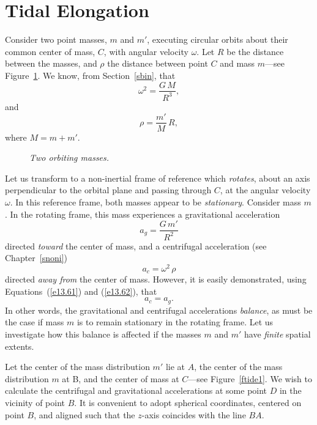 \section{Tidal Elongation}
Consider two point masses, $m$ and $m'$, executing circular orbits
about their common center of mass, $C$, with angular
velocity $\omega$. Let $R$ be the distance between
the masses, and $\rho$ the distance between point $C$ and mass $m$---see Figure~\ref{ftide}.
We know, from Section~\ref{sbin}, that
\begin{equation}\label{e13.61}
\omega^2 = \frac{G\,M}{R^3},
\end{equation}
and
\begin{equation}\label{e13.62}
\rho = \frac{m'}{M}\,R,
\end{equation}
where $M=m+m'$.

\begin{figure}
\centerline{}
\caption{\em Two orbiting masses.}\label{ftide}
\end{figure}

Let us transform to a non-inertial frame of reference which {\em rotates}, about an axis perpendicular to the orbital plane and  passing through $C$, at
the angular velocity $\omega$. In this reference frame, both masses appear to be {\em stationary}. Consider mass $m$. In the rotating frame, this mass experiences
a gravitational acceleration
\begin{equation}
a_g = \frac{G\,m'}{R^2}
\end{equation}
directed {\em toward}\/ the center of mass, and a  centrifugal acceleration (see Chapter~\ref{snoni})
\begin{equation}
a_c = \omega^2\,\rho
\end{equation}
directed {\em away from}\/ the center of mass.
However, it is easily demonstrated, using Equations~(\ref{e13.61}) and (\ref{e13.62}), that
\begin{equation}
a_c=a_g. 
\end{equation}
In other words, the gravitational and centrifugal accelerations
{\em balance}, as must be the case if mass $m$ is to remain stationary in the
rotating frame. Let us investigate how this balance is affected if the masses $m$ and $m'$
have  {\em finite}\/ spatial extents.

Let the center of the mass distribution $m'$ lie at $A$, the center of the
mass distribution $m$ at B, and the center of mass at $C$---see Figure~\ref{ftide1}. We wish to calculate the centrifugal and gravitational
accelerations at some point $D$ in the vicinity of point $B$. It is
convenient to adopt spherical  coordinates, centered on point $B$,
and aligned such that the $z$-axis coincides with the line $BA$. 

